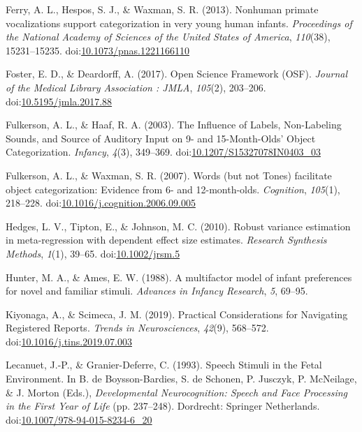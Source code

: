 \documentclass[man]{apa6}
\begin{document}
\hypertarget{ref-ferry_nonhuman_2013}{}
Ferry, A. L., Hespos, S. J., \& Waxman, S. R. (2013). Nonhuman primate
vocalizations support categorization in very young human infants.
\emph{Proceedings of the National Academy of Sciences of the United
States of America}, \emph{110}(38), 15231--15235.
doi:\href{https://doi.org/10.1073/pnas.1221166110}{10.1073/pnas.1221166110}

\hypertarget{ref-foster_open_2017}{}
Foster, E. D., \& Deardorff, A. (2017). Open Science Framework (OSF).
\emph{Journal of the Medical Library Association : JMLA}, \emph{105}(2),
203--206.
doi:\href{https://doi.org/10.5195/jmla.2017.88}{10.5195/jmla.2017.88}

\hypertarget{ref-fulkerson_influence_2003}{}
Fulkerson, A. L., \& Haaf, R. A. (2003). The Influence of Labels,
Non-Labeling Sounds, and Source of Auditory Input on 9- and
15-Month-Olds' Object Categorization. \emph{Infancy}, \emph{4}(3),
349--369.
doi:\href{https://doi.org/10.1207/S15327078IN0403_03}{10.1207/S15327078IN0403\_03}

\hypertarget{ref-fulkerson_words_2007}{}
Fulkerson, A. L., \& Waxman, S. R. (2007). Words (but not Tones)
facilitate object categorization: Evidence from 6- and 12-month-olds.
\emph{Cognition}, \emph{105}(1), 218--228.
doi:\href{https://doi.org/10.1016/j.cognition.2006.09.005}{10.1016/j.cognition.2006.09.005}

\hypertarget{ref-hedges_robust_2010}{}
Hedges, L. V., Tipton, E., \& Johnson, M. C. (2010). Robust variance
estimation in meta-regression with dependent effect size estimates.
\emph{Research Synthesis Methods}, \emph{1}(1), 39--65.
doi:\href{https://doi.org/10.1002/jrsm.5}{10.1002/jrsm.5}

\hypertarget{ref-hunter_multifactor_1988}{}
Hunter, M. A., \& Ames, E. W. (1988). A multifactor model of infant
preferences for novel and familiar stimuli. \emph{Advances in Infancy
Research}, \emph{5}, 69--95.

\hypertarget{ref-kiyonaga_practical_2019}{}
Kiyonaga, A., \& Scimeca, J. M. (2019). Practical Considerations for
Navigating Registered Reports. \emph{Trends in Neurosciences},
\emph{42}(9), 568--572.
doi:\href{https://doi.org/10.1016/j.tins.2019.07.003}{10.1016/j.tins.2019.07.003}

\hypertarget{ref-lecanuet_speech_1993}{}
Lecanuet, J.-P., \& Granier-Deferre, C. (1993). Speech Stimuli in the
Fetal Environment. In B. de Boysson-Bardies, S. de Schonen, P. Jusczyk,
P. McNeilage, \& J. Morton (Eds.), \emph{Developmental Neurocognition:
Speech and Face Processing in the First Year of Life} (pp. 237--248).
Dordrecht: Springer Netherlands.
doi:\href{https://doi.org/10.1007/978-94-015-8234-6_20}{10.1007/978-94-015-8234-6\_20}
\end{document}
